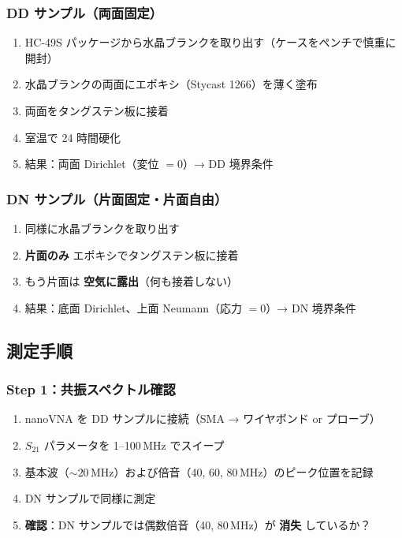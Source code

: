 \documentclass[11pt,a4paper]{article}
\begin{document}
\subsubsection{DD サンプル（両面固定）}

\begin{enumerate}
\item HC-49S パッケージから水晶ブランクを取り出す（ケースをペンチで慎重に開封）
\item 水晶ブランクの両面にエポキシ（Stycast 1266）を薄く塗布
\item 両面をタングステン板に接着
\item 室温で 24 時間硬化
\item 結果：両面 Dirichlet（変位 $= 0$）→ DD 境界条件
\end{enumerate}

\subsubsection{DN サンプル（片面固定・片面自由）}

\begin{enumerate}
\item 同様に水晶ブランクを取り出す
\item \textbf{片面のみ} エポキシでタングステン板に接着
\item もう片面は \textbf{空気に露出}（何も接着しない）
\item 結果：底面 Dirichlet、上面 Neumann（応力 $= 0$）→ DN 境界条件
\end{enumerate}

\subsection{測定手順}

\subsubsection{Step 1：共振スペクトル確認}

\begin{enumerate}
\item nanoVNA を DD サンプルに接続（SMA → ワイヤボンド or プローブ）
\item $S_{21}$ パラメータを 1--100\,MHz でスイープ
\item 基本波（$\sim 20$\,MHz）および倍音（40, 60, 80\,MHz）のピーク位置を記録
\item DN サンプルで同様に測定
\item \textbf{確認}：DN サンプルでは偶数倍音（40, 80\,MHz）が \textbf{消失} しているか？
\end{enumerate}
\end{document}
